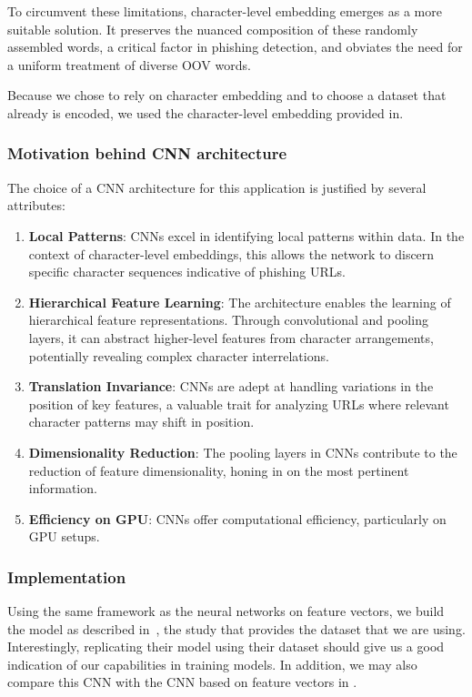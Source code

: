 \documentclass{article}
\begin{document}
    To circumvent these limitations, character-level embedding emerges as a more suitable solution.
    It preserves the nuanced composition of these randomly assembled words, a critical factor in phishing detection, and obviates the need for a uniform treatment of diverse OOV words.

    Because we chose to rely on character embedding and to choose a dataset that already is encoded, we used the character-level embedding provided in\cite{CharacterLevelCNN}.

    \subsubsection{Motivation behind CNN architecture}\label{subsubsec:character-level-cnn}

    The choice of a CNN architecture for this application is justified by several attributes:
    \begin{enumerate}
        \item \textbf{Local Patterns}: CNNs excel in identifying local patterns within data.
        In the context of character-level embeddings, this allows the network to discern specific character sequences indicative of phishing URLs.
        \item \textbf{Hierarchical Feature Learning}: The architecture enables the learning of hierarchical feature representations.
        Through convolutional and pooling layers, it can abstract higher-level features from character arrangements, potentially revealing complex character interrelations.
        \item \textbf{Translation Invariance}: CNNs are adept at handling variations in the position of key features, a valuable trait for analyzing URLs where relevant character patterns may shift in position.
        \item \textbf{Dimensionality Reduction}: The pooling layers in CNNs contribute to the reduction of feature dimensionality, honing in on the most pertinent information.
        \item \textbf{Efficiency on GPU}: CNNs offer computational efficiency, particularly on GPU setups.
    \end{enumerate}

    \subsubsection{Implementation}
    Using the same framework as the neural networks on feature vectors, we build the model as described in~\cite{CharacterLevelCNN}, the study that provides the dataset that we are using.
    Interestingly, replicating their model using their dataset should give us a good indication of our capabilities in training models.
    In addition, we may also compare this CNN with the CNN based on feature vectors in .
\end{document}

